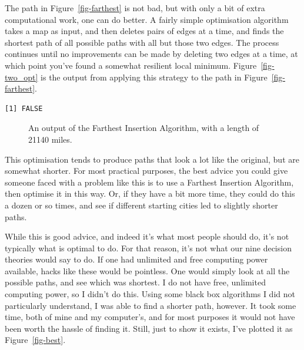 \documentclass[
  11pt,
  letterpaper,
  DIV=11,
  numbers=noendperiod,
  oneside]{scrartcl}
\begin{document}
The path in Figure~\ref{fig-farthest} is not bad, but with only a bit of
extra computational work, one can do better. A fairly simple
optimisation algorithm takes a map as input, and then deletes pairs of
edges at a time, and finds the shortest path of all possible paths with
all but those two edges. The process continues until no improvements can
be made by deleting two edges at a time, at which point you've found a
somewhat resilient local minimum. Figure~\ref{fig-two_opt} is the output
from applying this strategy to the path in Figure~\ref{fig-farthest}.

\begin{verbatim}
[1] FALSE
\end{verbatim}

\begin{figure}


\caption{\label{fig-two\_opt}An output of the Farthest Insertion
Algorithm, with a length of 21140 miles.}

\end{figure}%

This optimisation tends to produce paths that look a lot like the
original, but are somewhat shorter. For most practical purposes, the
best advice you could give someone faced with a problem like this is to
use a Farthest Insertion Algorithm, then optimise it in this way. Or, if
they have a bit more time, they could do this a dozen or so times, and
see if different starting cities led to slightly shorter paths.

While this is good advice, and indeed it's what most people should do,
it's not typically what is optimal to do. For that reason, it's not what
our nine decision theories would say to do. If one had unlimited and
free computing power available, hacks like these would be pointless. One
would simply look at all the possible paths, and see which was shortest.
I do not have free, unlimited computing power, so I didn't do this.
Using some black box algorithms I did not particularly understand, I was
able to find a shorter path, however. It took some time, both of mine
and my computer's, and for most purposes it would not have been worth
the hassle of finding it. Still, just to show it exists, I've plotted it
as Figure~\ref{fig-best}.
\end{document}
